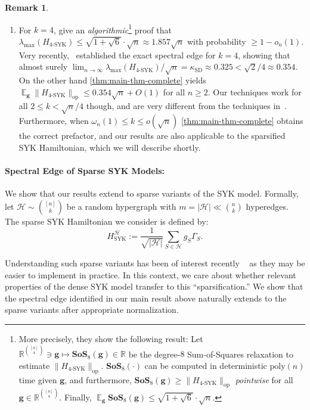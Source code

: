 \documentclass
[11pt,letterpaper]
{article}
\theoremstyle{definition}
\newtheorem{remark}[theorem]{Remark}
\newcommand{\R}{{\mathbb R}}
\newcommand{\1}{\mathbf{1}}
\newcommand{\cH}{\mathcal H}
\newcommand{\poly}{\mathrm{poly}}
\DeclareMathOperator*{\E}{\mathbb{E}}
\renewcommand{\geq}{\geqslant}
\renewcommand{\leq}{\leqslant}
\begin{document}
\begin{remark}
\begin{enumerate}[(1)]
    \item For $k = 4$, \cite{hastings2022optimizing} give an \emph{algorithmic}\footnote{More precisely, they show the following result: Let $\R^{\binom{[n]}{4}}\ni\bm g\mapsto \mathbf{SoS}_8(\bm g)\in\R$ be the degree-$8$ Sum-of-Squares relaxation to estimate $\|H_{\operatorname{4-SYK}}\|_{\operatorname{op}}$. $\mathbf{SoS}_8(\cdot)$ can be computed in deterministic $\poly(n)$ time given $\bm g$, and furthermore, $\mathbf{SoS}_8(\bm g)\geq\|H_{\operatorname{4-SYK}}\|_{\operatorname{op}}$ \emph{pointwise} for all $\bm g\in\R^{\binom{[n]}{4}}$. Finally, $\E_{\bm g}\mathbf{SoS}_8(\bm g)\leq\sqrt{1 + \sqrt{6}}\cdot\sqrt n$.} proof that $\lambda_{\max}\left(H_{\operatorname{4-SYK}}\right)\leq\sqrt{1 + \sqrt{6}}\cdot\sqrt{n}\approx 1.857\sqrt{n}$ with probability $\geq 1 - o_n(1)$. Very recently,~\cite{he2026spectraledgequarticsyk} established the exact spectral edge for $k=4$, showing that almost surely $\lim_{n\to\infty}\lambda_{\max}(H_{\operatorname{4-SYK}})/\sqrt{n} = \kappa_{\operatorname{SD}}\approx 0.325 < \sqrt{2}/4\approx 0.354$. On the other hand \cref{thm:main-thm-complete} yields $\E_{\bm g}\|H_{\operatorname{4-SYK}}\|_{\operatorname{op}}\leq 0.354\sqrt{n} + O(1)$ for all $n\geq 2$. Our techniques work for all $2\leq k < \sqrt{n}/4$ though, and are very different from the techniques in~\cite{he2026spectraledgequarticsyk}. Furthermore, when $\omega_n(1)\leq k\leq o(\sqrt{n})$ \cref{thm:main-thm-complete} obtains the correct prefactor, and our results are also applicable to the sparsified SYK Hamiltonian, which we will describe shortly.
    \end{enumerate}
\end{remark}

\paragraph{Spectral Edge of Sparse SYK Models: } We show that our results extend to sparse variants of the SYK model. Formally, let $\cH \sim \binom{[n]}{k}$  be a random hypergraph with $m= |\cH| \ll {n \choose k}$ hyperedges. The sparse SYK Hamiltonian we consider is defined by: 
\[H^\cH_{\operatorname{SYK}}:= \frac{1}{\sqrt{|\cH|}}\sum_{S\in\cH}g_S\Gamma_S.\]

Understanding such sparse variants has been of interest recently ~\cite{xu2020sparse,jafferis2022traversable,HerasymenkoSHT23,dingOptimizingSparseSYK2026} as they may be easier to implement in practice. In this context, we care about whether relevant properties of the dense SYK model transfer to this ``sparsification.'' We show that the spectral edge identified in our main result above naturally extends to the sparse variants after appropriate normalization.
\end{document}
